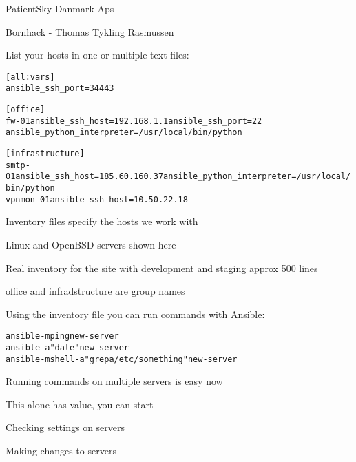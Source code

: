 \documentclass[18pt,landscape,a4paper,footrule]{foils}
\begin{document}

\begin{list2}
\item PatientSky Danmark Aps
\item Bornhack - Thomas Tykling Rasmussen
\end{list2}


List your hosts in one or multiple text files:
\begin{alltt}\footnotesize
[all:vars]
ansible_ssh_port=34443

[office]
fw-01 ansible_ssh_host=192.168.1.1 ansible_ssh_port=22
ansible_python_interpreter=/usr/local/bin/python

[infrastructure]
smtp-01     ansible_ssh_host=185.60.160.37 ansible_python_interpreter=/usr/local/bin/python
vpnmon-01   ansible_ssh_host=10.50.22.18

\end{alltt}

\begin{list2}
\item Inventory files specify the hosts we work with
\item Linux and OpenBSD servers shown here
\item Real inventory for the site with development and staging approx 500 lines
\item office and infradstructure are group names
\end{list2}



Using the inventory file you can run commands with Ansible:

\begin{alltt}\footnotesize
  ansible -m ping new-server
  ansible -a "date" new-server
  ansible -m shell -a "grep a /etc/something" new-server
\end{alltt}

\begin{list2}
\item Running commands on multiple servers is easy now
\item This alone has value, you can start
\item Checking settings on servers
\item Making changes to servers
\end{list2}


\end{document}
